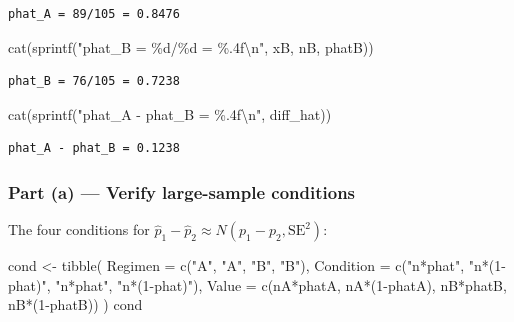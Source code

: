 \documentclass[
  letterpaper,
  DIV=11,
  numbers=noendperiod]{scrartcl}
\newenvironment{Shaded}{\begin{snugshade}}{\end{snugshade}}
\newcommand{\AttributeTok}[1]{\textcolor[rgb]{0.40,0.45,0.13}{#1}}
\newcommand{\DecValTok}[1]{\textcolor[rgb]{0.68,0.00,0.00}{#1}}
\newcommand{\FunctionTok}[1]{\textcolor[rgb]{0.28,0.35,0.67}{#1}}
\newcommand{\NormalTok}[1]{\textcolor[rgb]{0.00,0.23,0.31}{#1}}
\newcommand{\OtherTok}[1]{\textcolor[rgb]{0.00,0.23,0.31}{#1}}
\newcommand{\SpecialCharTok}[1]{\textcolor[rgb]{0.37,0.37,0.37}{#1}}
\newcommand{\StringTok}[1]{\textcolor[rgb]{0.13,0.47,0.30}{#1}}
\begin{document}
\begin{verbatim}
phat_A = 89/105 = 0.8476
\end{verbatim}

\begin{Shaded}
\begin{Highlighting}[]
\FunctionTok{cat}\NormalTok{(}\FunctionTok{sprintf}\NormalTok{(}\StringTok{"phat\_B = \%d/\%d = \%.4f}\SpecialCharTok{\textbackslash{}n}\StringTok{"}\NormalTok{, xB, nB, phatB))}
\end{Highlighting}
\end{Shaded}

\begin{verbatim}
phat_B = 76/105 = 0.7238
\end{verbatim}

\begin{Shaded}
\begin{Highlighting}[]
\FunctionTok{cat}\NormalTok{(}\FunctionTok{sprintf}\NormalTok{(}\StringTok{"phat\_A {-} phat\_B = \%.4f}\SpecialCharTok{\textbackslash{}n}\StringTok{"}\NormalTok{, diff\_hat))}
\end{Highlighting}
\end{Shaded}

\begin{verbatim}
phat_A - phat_B = 0.1238
\end{verbatim}

\subsubsection{Part (a) --- Verify large-sample
conditions}\label{part-a-verify-large-sample-conditions}

The four conditions for
\(\hat{p}_1 - \hat{p}_2 \approx N(p_1-p_2, \text{SE}^2)\):

\begin{Shaded}
\begin{Highlighting}[]
\NormalTok{cond }\OtherTok{\textless{}{-}} \FunctionTok{tibble}\NormalTok{(}
  \AttributeTok{Regimen =} \FunctionTok{c}\NormalTok{(}\StringTok{"A"}\NormalTok{, }\StringTok{"A"}\NormalTok{, }\StringTok{"B"}\NormalTok{, }\StringTok{"B"}\NormalTok{),}
  \AttributeTok{Condition =} \FunctionTok{c}\NormalTok{(}\StringTok{"n*phat"}\NormalTok{, }\StringTok{"n*(1{-}phat)"}\NormalTok{, }\StringTok{"n*phat"}\NormalTok{, }\StringTok{"n*(1{-}phat)"}\NormalTok{),}
  \AttributeTok{Value =} \FunctionTok{c}\NormalTok{(nA}\SpecialCharTok{*}\NormalTok{phatA, nA}\SpecialCharTok{*}\NormalTok{(}\DecValTok{1}\SpecialCharTok{{-}}\NormalTok{phatA), nB}\SpecialCharTok{*}\NormalTok{phatB, nB}\SpecialCharTok{*}\NormalTok{(}\DecValTok{1}\SpecialCharTok{{-}}\NormalTok{phatB))}
\NormalTok{)}
\NormalTok{cond}
\end{Highlighting}
\end{Shaded}
\end{document}
